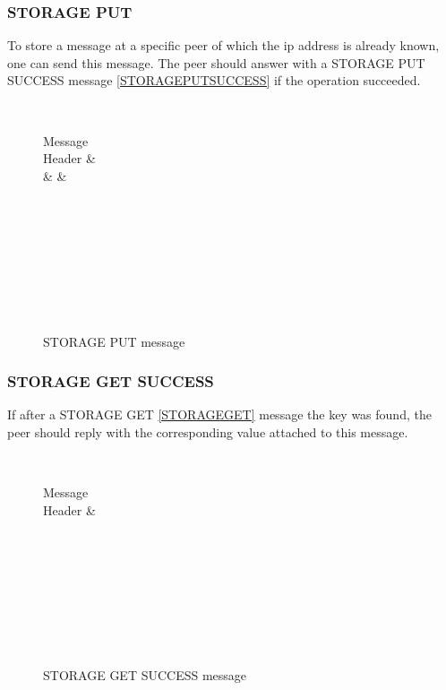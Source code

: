 \documentclass[a4paper, 11pt]{article}
\begin{document}
\subsubsection{STORAGE PUT}

To store a message at a specific peer of which the ip address is already known, one can send this message. The peer should answer with a STORAGE PUT SUCCESS message \ref{STORAGEPUTSUCCESS} if the operation succeeded.

\begin{figure}[H]
	\centering
	\begin{bytefield}[bitwidth=0.8em]{32}
		 \\
		\begin{rightwordgroup}{Message \\  Header}
			 &  \\
			 &  & 
		\end{rightwordgroup} \\
		 \\
		\skippedwords \\
		 \\
		 \\
		\skippedwords \\
		 \\
	\end{bytefield}
	\caption{STORAGE PUT message}
	\label{STORAGEPUT}
\end{figure}

\subsubsection{STORAGE GET SUCCESS}

If after a STORAGE GET \ref{STORAGEGET} message the key was found, the peer should reply with the corresponding value attached to this message.

\begin{figure}[H]
	\centering
	\begin{bytefield}[bitwidth=0.8em]{32}
		 \\
		\begin{rightwordgroup}{Message \\  Header}
			 & 
		\end{rightwordgroup} \\
		 \\
		\skippedwords \\
		 \\
		 \\
		\skippedwords \\
		 \\
	\end{bytefield}
	\caption{STORAGE GET SUCCESS message}
	\label{STORAGEGETSUCCESS}
\end{figure}
\end{document}
